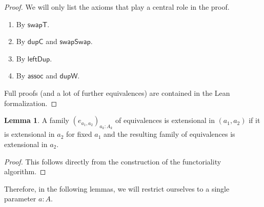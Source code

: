 \documentclass[a4paper]{article}
\theoremstyle{definition}
\newtheorem{lemma}[definition]{Lemma}
\theoremstyle{remark}
\newcommand{\nm}{\mathsf}
\begin{document}
\begin{proof}
  We will only list the axioms that play a central role in the proof.
  \begin{enumerate}
    \item By $\nm{swapT}.$
    \item By $\nm{dupC}$ and $\nm{swapSwap}.$
    \item By $\nm{leftDup}.$
    \item By $\nm{assoc}$ and $\nm{dupW}.$
  \end{enumerate}
  Full proofs (and a lot of further equivalences) are contained in the Lean formalization.
\end{proof}

\vspace{1ex}
\begin{lemma}
  A family $(e_{a_1,a_2})_{a_k : A_k}$ of equivalences is extensional in $(a_1,a_2)$ if
  it is extensional in $a_2$ for fixed $a_1$ and the resulting family of equivalences
  is extensional in $a_2.$
\end{lemma}
\vspace{-1ex}
\begin{proof}
  This follows directly from the construction of the functoriality algorithm.
\end{proof}

Therefore, in the following lemmas, we will restrict ourselves to a single parameter
$a : A.$
\end{document}
